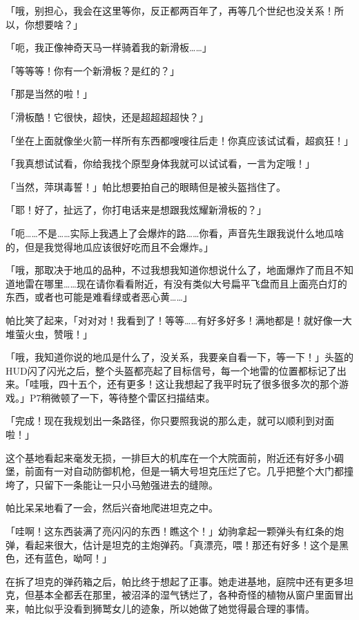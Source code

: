 「哦，别担心，我会在这里等你，反正都两百年了，再等几个世纪也没关系！所以，你想要啥？」

「呃，我正像神奇天马一样骑着我的新滑板……」

「等等等！你有一个新滑板？是红的？」

「那是当然的啦！」

「滑板酷！它很快，超快，还是超超超超快？」

「坐在上面就像坐火箭一样所有东西都嗖嗖往后走！你真应该试试看，超疯狂！」

「我真想试试看，你给我找个原型身体我就可以试试看，一言为定哦！」

「当然，萍琪毒誓！」帕比想要拍自己的眼睛但是被头盔挡住了。

「耶！好了，扯远了，你打电话来是想跟我炫耀新滑板的？」

「呃……不是……实际上我遇上了会爆炸的路……你看，声音先生跟我说什么地瓜啥的，但是我觉得地瓜应该很好吃而且不会爆炸。」

「哦，那取决于地瓜的品种，不过我想我知道你想说什么了，地面爆炸了而且不知道地雷在哪里……现在请你看看附近，有没有类似大号扁平飞盘而且上面亮白灯的东西，或者也可能是难看绿或者恶心黄……」

帕比笑了起来，「对对对！我看到了！等等……有好多好多！满地都是！就好像一大堆萤火虫，赞哦！」

「哦，我知道你说的地瓜是什么了，没关系，我要亲自看一下，等一下！」头盔的HUD闪了闪光之后，整个头盔都亮起了目标信号，每一个地雷的位置都标记了出来。「哇哦，四十五个，还有更多！这让我想起了我平时玩了很多很多次的那个游戏。」P7稍微顿了一下，等待整个雷区扫描结束。

「完成！现在我规划出一条路径，你只要照我说的那么走，就可以顺利到对面啦！」

\horizonline


这个基地看起来毫发无损，一排巨大的机库在一个大院面前，附近还有好多小碉堡，前面有一对自动防御机枪，但是一辆大号坦克压烂了它。几乎把整个大门都撞垮了，只留下一条能让一只小马勉强进去的缝隙。

帕比呆呆地看了一会，然后兴奋地爬进坦克之中。

「哇啊！这东西装满了亮闪闪的东西！瞧这个！」幼驹拿起一颗弹头有红条的炮弹，看起来很大，估计是坦克的主炮弹药。「真漂亮，喂！那还有好多！这个是黑色，还有蓝色，呦呵！」

在拆了坦克的弹药箱之后，帕比终于想起了正事。她走进基地，庭院中还有更多坦克，但基本全都丢在那里，被沼泽的湿气锈烂了，各种奇怪的植物从窗户里面冒出来，帕比似乎没看到狮鹫女儿的迹象，所以她做了她觉得最合理的事情。


